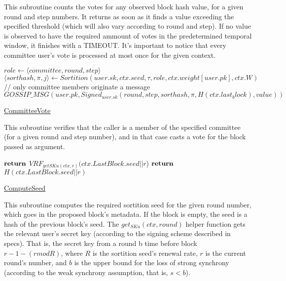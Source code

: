 \documentclass[10pt,a4paper]{article}
\begin{document}
This subroutine counts the votes for any observed block hash value, for a given round and step numbers.
It returns as soon as it finds a value exceeding the specified threshold (which will also vary according to round and step).
If no value is observed to have the required ammount of votes in the predetermined temporal window, it finishes with a TIMEOUT.
It's important to notice that every committee user's vote is processed at most once for the given context.

\begin{algorithm}
    \begin{algorithmic}[H]
    \State $role \gets \langle {committee},round,step\rangle$
    \State $\langle sorthash,\pi,j\rangle \gets Sortition(user.sk,ctx.seed,\tau ,role,ctx.weight[user.pk],ctx.W)$
    // only committee members originate a message
        \State $GOSSIP\_MSG(user.pk, Signed_{user.sk} (round,step,sorthash,\pi,H(ctx.last_block),value))$
    \EndIf
    \EndFunction
    \end{algorithmic}
    \caption{\underline{CommitteeVote}}
\end{algorithm}

This subroutine verifies that the caller is a member of the specified committee (for a given round and step number), 
and in that case casts a vote for the block passed as argument.

\begin{algorithm}
    \begin{algorithmic}[H]
            \State $\Return$ $VRF_{getSKu(ctx, r)}(ctx.LastBlock.seed||r$)
        \Else
            \State $\Return$ $H(ctx.LastBlock.seed||r)$
        \EndIf
    \EndFunction
    \end{algorithmic}
    \caption{\underline{ComputeSeed}}
\end{algorithm}

This subroutine computes the required sortition seed for the given round number, which goes in the proposed block's metadata.
If the block is empty, the seed is a hash of the previous block's seed.
The $get_{SKu}(ctx, round)$ helper function gets the relevant user's secret key (according to the signing scheme described in specs).
That is, the secret key from a round b time before block $r-1-(r mod R)$, where $R$ is the sortition seed's renewal rate, $r$ is the current round's number,
and $b$ is the upper bound for the loss of strong synchrony (according to the weak synchrony assumption, that is, $s < b$).
\end{document}
